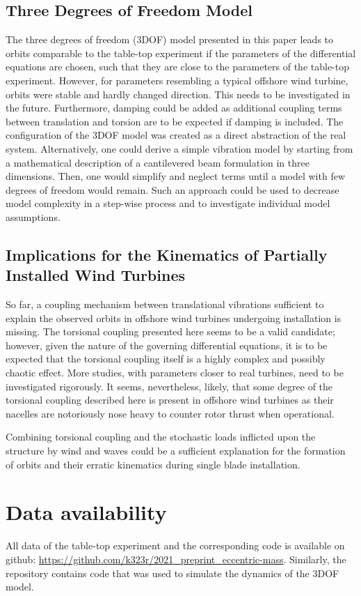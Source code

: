 \documentclass{article}
\begin{document}
\subsection{Three Degrees of Freedom Model}

The three degrees of freedom (3DOF) model presented in this paper leads to orbits comparable to the table-top experiment if the parameters of the differential equations are chosen, such that they are close to the parameters of the table-top experiment. However, for parameters resembling a typical offshore wind turbine, orbits were stable and hardly changed direction. This needs to be investigated in the future. Furthermore, damping could be added as additional coupling terms between translation and torsion are to be expected if damping is included. The configuration of the 3DOF model was created as a direct abstraction of the real system. Alternatively, one could derive a simple vibration model by starting from a mathematical description of a cantilevered beam formulation in three dimensions. Then, one would simplify and neglect terms until a model with few degrees of freedom would remain. Such an approach could be used to decrease model complexity in a step-wise process and to investigate individual model assumptions.

\subsection{Implications for the Kinematics of Partially Installed Wind Turbines}

So far, a coupling mechanism between translational vibrations sufficient to explain the observed orbits in offshore wind turbines undergoing installation is missing. The torsional coupling presented here seems to be a valid candidate; however, given the nature of the governing differential equations, it is to be expected that the torsional coupling itself is a highly complex and possibly chaotic effect. More studies, with parameters closer to real turbines, need to be investigated rigorously. It seems, nevertheless, likely, that some degree of the torsional coupling described here is present in offshore wind turbines as their nacelles are notoriously nose heavy to counter rotor thrust when operational. 

Combining torsional coupling and the stochastic loads inflicted upon the structure by wind and waves could be a sufficient explanation for the formation of orbits and their erratic kinematics during single blade installation.

\section*{Data availability}
 All data of the table-top experiment and the corresponding code is available on github: \url{https://github.com/k323r/2021_preprint_eccentric-mass}. Similarly, the repository contains code that was used to simulate the dynamics of the 3DOF model.
 

\end{document}
